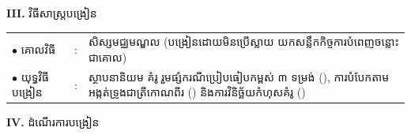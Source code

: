 \documentclass[a4paper,10pt]{article}
\begin{document}
{\vspace{1pt}

\textbf{III.} {\muol វិធីសាស្រ្តបង្រៀន}\\[1pt]
\hspace*{0.45cm}%
\begin{tabular}{@{}l l L{14.85cm}@{}}
  $\bullet$ \hspace{0.25cm} គោលវិធី & : & សិស្សមជ្ឈមណ្ឌល (បង្រៀនដោយមិនប្រើស្លាយ  យកសន្លឹកកិច្ចការបំពេញចន្លោះជាគោល) \\
  $\bullet$ \hspace{0.25cm} យុទ្ធវិធីបង្រៀន & : & ស្ថាបនានិយម គំរូ  រួមផ្សំករណីប្រៀបធៀបកម្ពស់ ៣ ទម្រង់ (), ការបំបែកតាមអង្កត់ទ្រូងជាត្រីកោណពីរ () និងការវិនិច្ឆ័យកំហុសគំរូ () \\
\end{tabular}
}

\vspace{1pt}

\textbf{IV.} {\muol ដំណើរការបង្រៀន}

\vspace{1pt}
\end{document}
